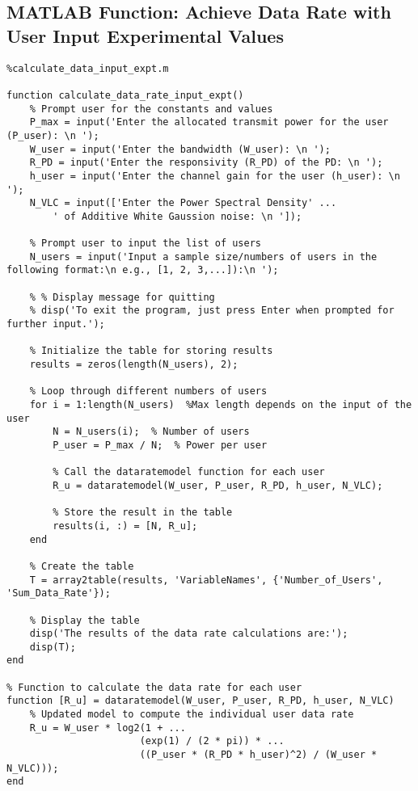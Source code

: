 \subsection{MATLAB Function: Achieve Data Rate with User Input Experimental Values }

\begin{lstlisting}
%calculate_data_input_expt.m

function calculate_data_rate_input_expt()
    % Prompt user for the constants and values
    P_max = input('Enter the allocated transmit power for the user (P_user): \n ');
    W_user = input('Enter the bandwidth (W_user): \n ');
    R_PD = input('Enter the responsivity (R_PD) of the PD: \n ');
    h_user = input('Enter the channel gain for the user (h_user): \n ');
    N_VLC = input(['Enter the Power Spectral Density' ...
        ' of Additive White Gaussion noise: \n ']);
    
    % Prompt user to input the list of users
    N_users = input('Input a sample size/numbers of users in the following format:\n e.g., [1, 2, 3,...]):\n ');

    % % Display message for quitting
    % disp('To exit the program, just press Enter when prompted for further input.');

    % Initialize the table for storing results
    results = zeros(length(N_users), 2);

    % Loop through different numbers of users
    for i = 1:length(N_users)  %Max length depends on the input of the user
        N = N_users(i);  % Number of users
        P_user = P_max / N;  % Power per user
        
        % Call the dataratemodel function for each user
        R_u = dataratemodel(W_user, P_user, R_PD, h_user, N_VLC);
        
        % Store the result in the table
        results(i, :) = [N, R_u];
    end

    % Create the table
    T = array2table(results, 'VariableNames', {'Number_of_Users', 'Sum_Data_Rate'});

    % Display the table
    disp('The results of the data rate calculations are:');
    disp(T);
end

% Function to calculate the data rate for each user
function [R_u] = dataratemodel(W_user, P_user, R_PD, h_user, N_VLC)
    % Updated model to compute the individual user data rate
    R_u = W_user * log2(1 + ...
                       (exp(1) / (2 * pi)) * ...
                       ((P_user * (R_PD * h_user)^2) / (W_user * N_VLC)));
end
\end{lstlisting}


